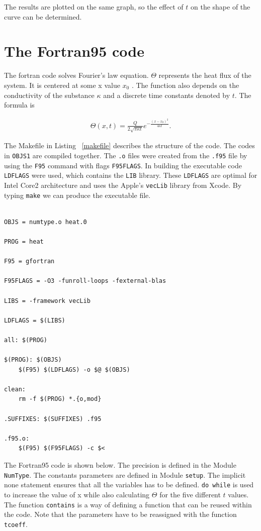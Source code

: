 \documentclass[12pt]{article}
\begin{document}
The results are plotted on the same graph, so the effect of $t$ on the shape of the curve can be determined. 

\section{The Fortran95 code}

The fortran code solves Fourier's law equation. $\Theta$ represents the heat flux of the system. It is centered at some x value ${x}_{0}$ . The function also depends on the conductivity of the substance $\kappa$ and a discrete time constants denoted by $t$. The formula is 

\begin{gather}
\Theta(x,t) = \frac{Q}{2 \sqrt{\pi \kappa t}}e^{-\frac{(x-x_0)^2}{4 \kappa t}}.
\end{gather}

The Makefile in Listing \ \ref{makefile} describes the structure of the code. The codes in {\tt OBJS1} are 
compiled together. The {\tt .o} files were created from the {\tt .f95} file by using the {\tt F95} command
with flags {\tt F95FLAGS}. In building the executable code {\tt LDFLAGS} were used, which contains 
the {\tt LIB} library. These {\tt LDFLAGS} are optimal for Intel Core2 architecture and uses the 
Apple's {\tt vecLib} library from Xcode. By typing {\tt make} we can produce the executable file.





\begin{lstlisting}[frame=single,caption={Typical {\tt Makefile}},label=makefile]

OBJS = numtype.o heat.0 

PROG = heat

F95 = gfortran

F95FLAGS = -O3 -funroll-loops -fexternal-blas

LIBS = -framework vecLib

LDFLAGS = $(LIBS)

all: $(PROG) 

$(PROG): $(OBJS)
	$(F95) $(LDFLAGS) -o $@ $(OBJS) 

clean:
	rm -f $(PROG) *.{o,mod}

.SUFFIXES: $(SUFFIXES) .f95

.f95.o:
	$(F95) $(F95FLAGS) -c $<

\end{lstlisting}

The Fortran95 code is shown below. The precision is defined in the Module {\tt NumType}. The constants parameters are defined in Module {\tt setup}. The implicit none statement ensures that all the variables has to be defined. {\tt do while} is used to increase the value of x while also calculating $\Theta$ for the five different $t$ values. The function {\tt contains} is a way of defining a function that can be reused within the code. Note that the parameters have to be reassigned with the function {\tt tcoeff}. 
\end{document}
